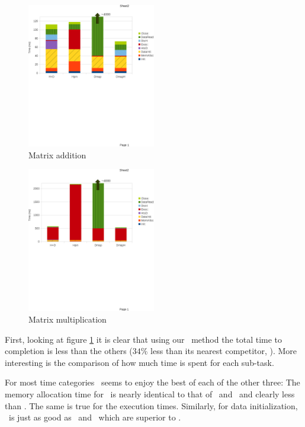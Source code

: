 \begin{figure}[tb]
\centering
\includegraphics[width=0.5\textwidth, trim=0.0in 3.25in 0.0in 0.25in, clip=true]{eps/madd_time_spent.eps}
\caption{Matrix addition}
\label{fig:madd_time_spent}
\end{figure}
\begin{figure}[tb]
\centering
\includegraphics[width=0.5\textwidth, trim=0.0in 3.0in 0.0in 0.5in, clip=true]{eps/mmul_time_spent.eps}
\caption{Matrix multiplication}
\label{fig:mmul_time_spent}
\end{figure}

First, looking at figure \ref{fig:madd_time_spent} it is clear that using our
\dmh\ method the total time to completion is less than the
others ($34\%$ less than its nearest competitor, \hd). More interesting is the
comparison of how much time is spent for each sub-task. 

For most time categories \dmh\ seems to enjoy the best of each of the
other three: The memory allocation time for \dmh\ is nearly identical to that of
\hd\ and \dm\ and clearly less than \hp. The same is true for the
execution times. Similarly, for data initialization, \dmh\ is just as good
as \hp\ and \dm\ which are superior to \hd. 

